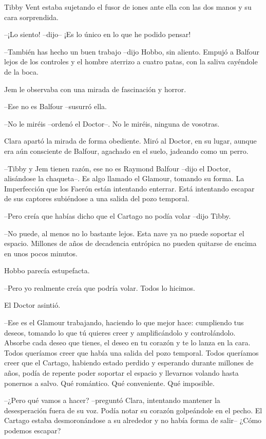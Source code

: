 {Tibby Vent estaba sujetando el fusor de iones ante ella con las dos
manos y su cara sorprendida.}

{--¡Lo siento! --dijo-- ¡Es lo único en lo que he podido pensar!}

{--También has hecho un buen trabajo --dijo Hobbo, sin aliento. Empujó a
 Balfour lejos de los controles y el hombre aterrizo a cuatro patas, con
la saliva cayéndole de la boca.}

{Jem le observaba con una mirada de fascinación y horror.}

{--Ese no es Balfour --susurró ella.}

{--No le miréis --ordenó el Doctor--. No le miréis, ninguna de
vosotras.}

{Clara apartó la mirada de forma obediente. Miró al Doctor, en su lugar,
 aunque era aún consciente de Balfour, agachado en el suelo, jadeando
como un perro.}

{--Tibby y Jem tienen razón, ese no es Raymond Balfour --dijo el Doctor,
 alisándose la chaqueta--. Es algo llamado el Glamour, tomando su forma.
 La Imperfección que los Faerón están intentando enterrar. Está
 intentando escapar de sus captores subiéndose a una salida del pozo
temporal.}

{--Pero creía que habías dicho que el Cartago no podía volar --dijo
Tibby.}

{--No puede, al menos no lo bastante lejos. Esta nave ya no puede
 soportar el espacio. Millones de años de decadencia entrópica no pueden
quitarse de encima en unos pocos minutos.}

{Hobbo parecía estupefacta.}

{--Pero yo realmente creía que podría volar. Todos lo hicimos.}

{El Doctor asintió.}

{--Ese es el Glamour trabajando, haciendo lo que mejor hace: cumpliendo
 tus deseos, tomando lo que tú quieres creer y amplificándolo y
 controlándolo. Absorbe cada deseo que tienes, el deseo en tu corazón y
 te lo lanza en la cara. Todos queríamos creer que había una salida del
 pozo temporal. Todos queríamos creer que el Cartago, habiendo estado
 perdido y esperando durante millones de años, podía de repente poder
 soportar el espacio y llevarnos volando hasta ponernos a salvo. Qué
romántico. Qué conveniente. Qué imposible.}

{--¿Pero qué vamos a hacer? --preguntó Clara, intentando mantener la
 desesperación fuera de su voz. Podía notar su corazón golpeándole en el
 pecho. El Cartago estaba desmoronándose a su alrededor y no había forma
de salir-- ¿Cómo podemos escapar?}

